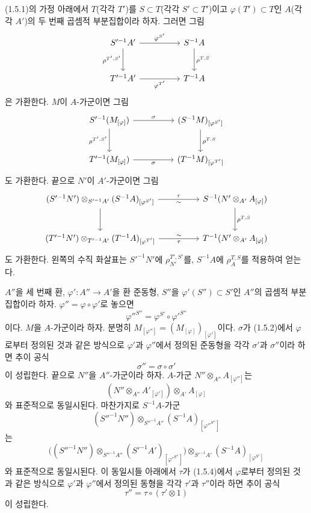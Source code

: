 \begin{env}[1.5.6]
\label{0.1.5.6-ko}
(1.5.1)의 가정 아래에서 $T$(각각 $T'$)를 $S\subset T$(각각 $S'\subset T'$)이고 $\varphi(T')\subset T$인 $A$(각각 $A'$)의 두 번째 곱셈적 부분집합이라 하자. 그러면 그림
\[
\begin{tikzcd}[column sep=huge,row sep=large]
S'^{-1}A' \arrow[r,"\varphi^{S'}"] \arrow[d,"\rho^{T',S'}"']
  & S^{-1}A \arrow[d,"\rho^{T,S}"] \\
T'^{-1}A' \arrow[r,"\varphi^{T'}"']
  & T^{-1}A
\end{tikzcd}
\]
은 가환한다. $M$이 $A$-가군이면 그림
\[
\begin{tikzcd}[column sep=huge,row sep=large]
S'^{-1}(M_{[\varphi]}) \arrow[r,"\sigma"] \arrow[d,"\rho^{T',S'}"']
  & (S^{-1}M)_{[\varphi^{S'}]} \arrow[d,"\rho^{T,S}"] \\
T'^{-1}(M_{[\varphi]}) \arrow[r,"\sigma"']
  & (T^{-1}M)_{[\varphi^{T'}]}
\end{tikzcd}
\]
도 가환한다. 끝으로 $N'$이 $A'$-가군이면 그림
\[
\begin{tikzcd}[column sep=huge,row sep=large]
(S'^{-1}N')\otimes_{S'^{-1}A'}(S^{-1}A)_{[\varphi^{S'}]}
  \arrow[r,"\tau","{\sim}"'] \arrow[d]
  & S^{-1}(N'\otimes_{A'}A_{[\varphi]}) \arrow[d,"\rho^{T,S}"] \\
(T'^{-1}N')\otimes_{T'^{-1}A'}(T^{-1}A)_{[\varphi^{T'}]}
  \arrow[r,"\tau"',"{\sim}"]
  & T^{-1}(N'\otimes_{A'}A_{[\varphi]})
\end{tikzcd}
\]
도 가환한다. 왼쪽의 수직 화살표는 $S'^{-1}N'$에 $\rho_{N'}^{T',S'}$를, $S^{-1}A$에 $\rho_A^{T,S}$를 적용하여 얻는다.
\end{env}


\begin{env}[1.5.7]
\label{0.1.5.7-ko}
$A''$을 세 번째 환, $\varphi':A''\to A'$을 환 준동형, $S''$을 $\varphi'(S'')\subset S'$인 $A''$의 곱셈적 부분집합이라 하자. $\varphi''=\varphi\circ\varphi'$로 놓으면
\[
  \varphi''^{S''}=\varphi^{S'}\circ\varphi'^{S''}
\]
이다.
$M$을 $A$-가군이라 하자. 분명히 $M_{[\varphi'']}=(M_{[\varphi]})_{[\varphi']}$이다. $\sigma$가 (1.5.2)에서 $\varphi$로부터 정의된 것과 같은 방식으로 $\varphi'$과 $\varphi''$에서 정의된 준동형을 각각 $\sigma'$과 $\sigma''$이라 하면 추이 공식
\[
  \sigma''=\sigma\circ\sigma'
\]
이 성립한다.
끝으로 $N''$을 $A''$-가군이라 하자. $A$-가군 $N''\otimes_{A''}A_{[\varphi'']}$는
\[
  (N''\otimes_{A''}A'_{[\varphi']})\otimes_{A'}A_{[\varphi]}
\]
와 표준적으로 동일시된다.
마찬가지로 $S^{-1}A$-가군
\[
  (S''^{-1}N'')\otimes_{S''^{-1}A''}
  (S^{-1}A)_{[\varphi''^{S''}]}
\]
는
\[
  \bigl((S''^{-1}N'')\otimes_{S''^{-1}A''}
  (S'^{-1}A')_{[\varphi'^{S''}]}\bigr)
  \otimes_{S'^{-1}A'}(S^{-1}A)_{[\varphi^{S'}]}
\]
와 표준적으로 동일시된다.
이 동일시들 아래에서 $\tau$가 (1.5.4)에서 $\varphi$로부터 정의된 것과 같은 방식으로 $\varphi'$과 $\varphi''$에서 정의된 동형을 각각 $\tau'$과 $\tau''$이라 하면 추이 공식
\[
  \tau''=\tau\circ(\tau'\otimes 1)
\]
이 성립한다.
\end{env}

